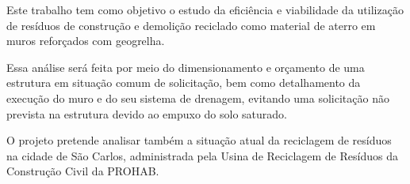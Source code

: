 Este trabalho tem como objetivo o estudo da eficiência e viabilidade da utilização de resíduos de construção e demolição reciclado como material de aterro em muros reforçados com geogrelha. 

Essa análise será feita por meio do dimensionamento e orçamento de uma estrutura em situação comum de solicitação, bem como detalhamento da execução do muro e do seu sistema de drenagem, evitando uma solicitação não prevista na estrutura devido ao empuxo do solo saturado.

O projeto pretende analisar também a situação atual da reciclagem de resíduos na cidade de São Carlos, administrada pela Usina de Reciclagem de Resíduos da Construção Civil da PROHAB. 